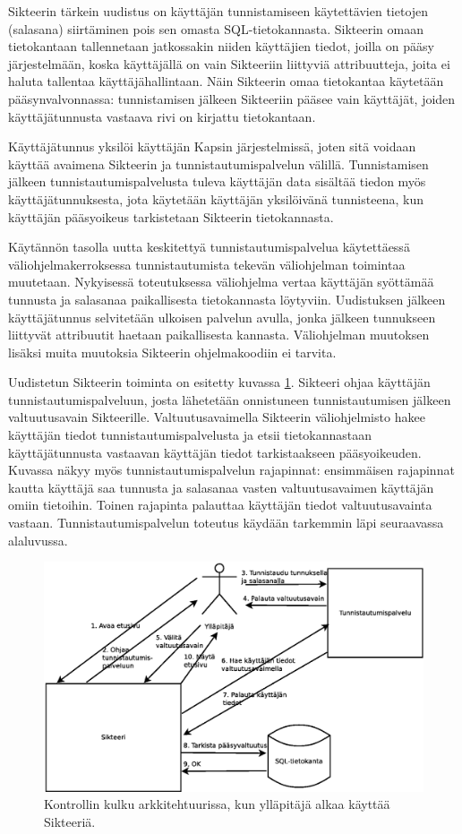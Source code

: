 Sikteerin tärkein uudistus on käyttäjän tunnistamiseen käytettävien tietojen (salasana) siirtäminen pois sen omasta SQL-tietokannasta. Sikteerin omaan tietokantaan tallennetaan jatkossakin niiden käyttäjien tiedot, joilla on pääsy järjestelmään, koska käyttäjällä on vain Sikteeriin liittyviä attribuutteja, joita ei haluta tallentaa käyttäjähallintaan. Näin Sikteerin omaa tietokantaa käytetään pääsynvalvonnassa: tunnistamisen jälkeen Sikteeriin pääsee vain käyttäjät, joiden käyttäjätunnusta vastaava rivi on kirjattu tietokantaan.

Käyttäjätunnus yksilöi käyttäjän Kapsin järjestelmissä, joten sitä voidaan käyttää avaimena Sikteerin ja tunnistautumispalvelun välillä. Tunnistamisen jälkeen tunnistautumispalvelusta tuleva käyttäjän data sisältää tiedon myös käyttäjätunnuksesta, jota käytetään käyttäjän yksilöivänä tunnisteena, kun käyttäjän pääsyoikeus tarkistetaan Sikteerin tietokannasta.

Käytännön tasolla uutta keskitettyä tunnistautumispalvelua käytettäessä väliohjelmakerroksessa tunnistautumista tekevän väliohjelman toimintaa muutetaan. Nykyisessä toteutuksessa väliohjelma vertaa käyttäjän syöttämää tunnusta ja salasanaa paikallisesta tietokannasta löytyviin. Uudistuksen jälkeen käyttäjätunnus selvitetään ulkoisen palvelun avulla, jonka jälkeen tunnukseen liittyvät attribuutit haetaan paikallisesta kannasta. Väliohjelman muutoksen lisäksi muita muutoksia Sikteerin ohjelmakoodiin ei tarvita.

Uudistetun Sikteerin toiminta on esitetty kuvassa \ref{auth_kapsi_fi_flow}. Sikteeri ohjaa käyttäjän tunnistautumispalveluun, josta lähetetään onnistuneen tunnistautumisen jälkeen valtuutusavain Sikteerille. Valtuutusavaimella Sikteerin väliohjelmisto hakee käyttäjän tiedot tunnistautumispalvelusta ja etsii tietokannastaan käyttäjätunnusta vastaavan käyttäjän tiedot tarkistaakseen pääsyoikeuden. Kuvassa näkyy myös tunnistautumispalvelun rajapinnat: ensimmäisen rajapinnat kautta käyttäjä saa tunnusta ja salasanaa vasten valtuutusavaimen käyttäjän omiin tietoihin. Toinen rajapinta palauttaa käyttäjän tiedot valtuutusavainta vastaan. Tunnistautumispalvelun toteutus käydään tarkemmin läpi seuraavassa alaluvussa.

\begin{figure}[ht]
\centering
\includegraphics[width=\textwidth]{toteutus/arkkitehtuuri/auth_kapsi_fi_flow.eps}
\caption{Kontrollin kulku arkkitehtuurissa, kun ylläpitäjä alkaa käyttää Sikteeriä.}%
\label{auth_kapsi_fi_flow}
\end{figure}